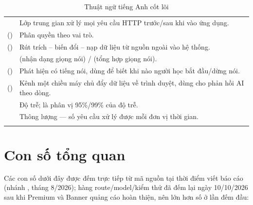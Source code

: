 \begin{longtable}{L{3.6cm} L{10.2cm}}
 & Lớp trung gian xử lý mọi yêu cầu HTTP trước/sau khi vào ứng dụng.\\
 () & Phân quyền theo vai trò.\\
 () & Rút trích – biến đổi – nạp dữ liệu từ nguồn ngoài vào hệ thống.\\
 &  (nhận dạng giọng nói) /  (tổng hợp giọng nói).\\
 () & Phát hiện có tiếng nói, dùng để biết khi nào người học bắt đầu/dừng nói.\\
 () & Kênh một chiều máy chủ đẩy dữ liệu về trình duyệt, dùng cho phản hồi AI theo dòng.\\
 & Độ trễ;  là phân vị 95\%/99\% của độ trễ.\\
 & Thông lượng — số yêu cầu xử lý được mỗi đơn vị thời gian.\\
\bottomrule
\caption{Thuật ngữ tiếng Anh cốt lõi}
\end{longtable}

\section{Con số tổng quan}

Các con số dưới đây được đếm trực tiếp từ mã nguồn tại thời điểm viết báo cáo
(nhánh , tháng 8/2026); hàng route/model/kiểm thử đã đếm lại ngày 10/10/2026
sau khi Premium và Banner quảng cáo hoàn thiện, nên lớn hơn số ở lần đếm đầu:

